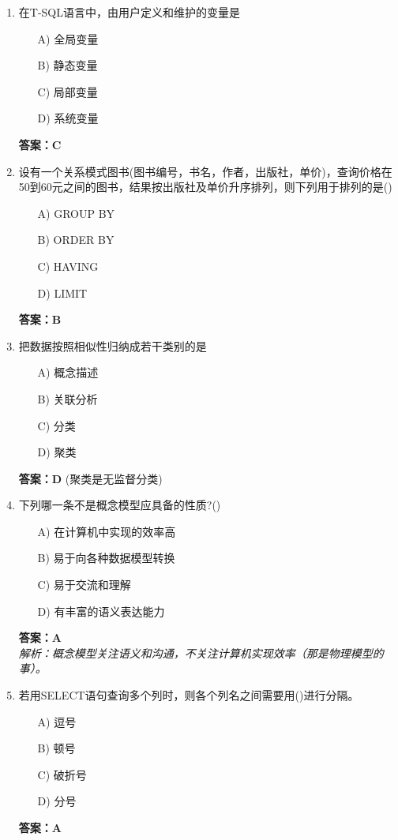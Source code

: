 \documentclass[a4paper,12pt]{article}
\begin{document}
\begin{enumerate}[label=\arabic*.]
\item 在T-SQL语言中，由用户定义和维护的变量是
\begin{itemize}
    \item[A)] 全局变量
    \item[B)] 静态变量
    \item[C)] 局部变量
    \item[D)] 系统变量
\end{itemize}
\textbf{答案：C}

\item 设有一个关系模式图书(图书编号，书名，作者，出版社，单价)，查询价格在50到60元之间的图书，结果按出版社及单价升序排列，则下列用于排列的是()
\begin{itemize}
    \item[A)] GROUP BY
    \item[B)] ORDER BY
    \item[C)] HAVING
    \item[D)] LIMIT
\end{itemize}
\textbf{答案：B}

\item 把数据按照相似性归纳成若干类别的是
\begin{itemize}
    \item[A)] 概念描述
    \item[B)] 关联分析
    \item[C)] 分类
    \item[D)] 聚类
\end{itemize}
\textbf{答案：D} (聚类是无监督分类)

\item 下列哪一条不是概念模型应具备的性质?()
\begin{itemize}
    \item[A)] 在计算机中实现的效率高
    \item[B)] 易于向各种数据模型转换
    \item[C)] 易于交流和理解
    \item[D)] 有丰富的语义表达能力
\end{itemize}
\textbf{答案：A} \\
\textit{解析：概念模型关注语义和沟通，不关注计算机实现效率（那是物理模型的事）。}

\item 若用SELECT语句查询多个列时，则各个列名之间需要用()进行分隔。
\begin{itemize}
    \item[A)] 逗号
    \item[B)] 顿号
    \item[C)] 破折号
    \item[D)] 分号
\end{itemize}
\textbf{答案：A}


\end{enumerate}
\end{document}
